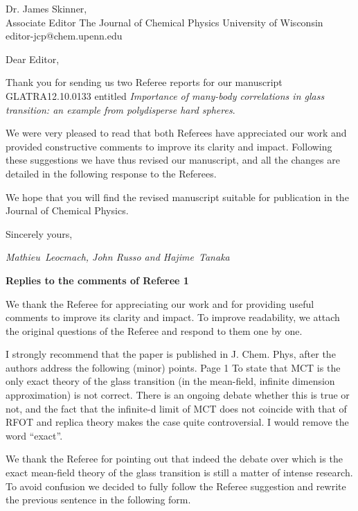 \documentclass[a4paper, rebuttal, parskip=true, firsthead=false, fromemail=false, foldmarks=false]{scrlttr2}
\begin{document}
 
\begin{letter}{Dr. James Skinner,\\Associate Editor
The Journal of Chemical Physics
University of Wisconsin\\
editor-jcp@chem.upenn.edu }
\opening{Dear Editor,}

Thank you for sending us two Referee reports for our manuscript GLATRA12.10.0133 entitled
\emph{Importance of many-body correlations in glass transition: an example from polydisperse hard spheres}.

We were very pleased to read that both Referees have appreciated our work and provided constructive comments to
improve its clarity and impact. Following these suggestions we have thus revised our manuscript, and all the changes
are detailed in the following response to the Referees.

We hope that you will find the revised manuscript suitable for publication in the Journal of Chemical Physics. 

Sincerely yours,

\emph{Mathieu~Leocmach, John Russo  and Hajime~Tanaka}

\clearpage


\textsf{\textbf{Replies to the comments of Referee 1}}

We thank the Referee for appreciating our work and for providing useful comments to improve its clarity and impact.
To improve readability, we attach the original questions of the Referee and respond to them one by one.

\begin{quotationi}
[...] I strongly recommend that the paper is published in J. Chem. Phys, after the authors address the following (minor) points.
\newline\newline
Page 1
To state that MCT is the only exact theory of the glass transition (in the mean-field, infinite dimension approximation) is not correct. There is an ongoing debate whether this is true or not, and the fact that the infinite-d limit of MCT does not coincide with that of RFOT and replica theory makes the case quite controversial. I would remove the word ``exact''.
\end{quotationi}

We thank the Referee for pointing out that indeed the debate over which is the exact mean-field theory of the glass transition is still a matter of intense research.
To avoid confusion we decided to fully follow the Referee suggestion and rewrite the previous sentence in the following form.


\end{letter}
\end{document}
